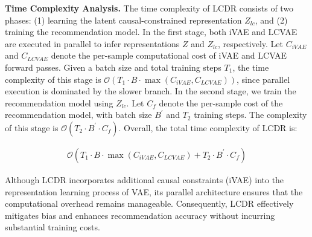 \documentclass[sigconf]{acmart}
\begin{document}
\textbf{Time Complexity Analysis.}
The time complexity of LCDR consists of two phases: (1) learning the latent causal-constrained representation \( {Z}_{lc} \), and (2) training the recommendation model. In the first stage, both iVAE and LCVAE are executed in parallel to infer representations \( Z \) and \( {Z}_{lc} \), respectively. Let \( {C}_{iVAE} \) and \( {C}_{LCVAE} \) denote the per-sample computational cost of iVAE and LCVAE forward passes. Given a batch size and total training steps \( {T}_{1} \), the time complexity of this stage is \( \mathcal{O}\left( {{T}_{1} \cdot  B \cdot  \max \left( {{C}_{iVAE}, {C}_{LCVAE}}\right) }\right) \), since parallel execution is dominated by the slower branch. In the second stage, we train the recommendation model using \( {Z}_{lc} \). Let \( {C}_{f} \) denote the per-sample cost of the recommendation model, with batch size \( {B}^{\prime } \) and \( {T}_{2} \) training steps. The complexity of this stage is \( \mathcal{O}\left( {{T}_{2} \cdot  {B}^{\prime } \cdot  {C}_{f}}\right) \). Overall, the total time complexity of LCDR is:

\begin{equation}
\begin{split}
\mathcal{O}\left( {{T}_{1} \cdot  B \cdot  \max \left( {{C}_{iVAE}, {C}_{LCVAE}}\right)  + {T}_{2} \cdot  {B}^{\prime } \cdot  {C}_{f}}\right) 
\end{split}
\end{equation}

Although LCDR incorporates additional causal constraints (iVAE) into the representation learning process of VAE, its parallel architecture ensures that the computational overhead remains manageable. Consequently, LCDR effectively mitigates bias and enhances recommendation accuracy without incurring substantial training costs.
\end{document}
